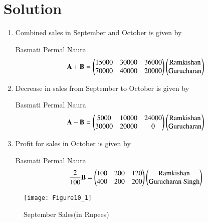 \documentclass[journal,12pt,twocolumn]{IEEEtran}
\begin{document}
\section{Solution}
%
\begin{enumerate}
    \item Combined sales in September and October is given by
    
    \hspace{1.4cm} Basmati \hspace{0.02cm} Permal \hspace{0.01cm} Naura
    \begin{align}
    \mathbf{A}+\mathbf{B}=\begin{pmatrix}15000 & 30000 & 36000 \\ 70000 & 40000 & 20000\end{pmatrix}\begin{pmatrix}\text{Ramkishan} \\ \text{Gurucharan}\end{pmatrix} 
    \end{align}
    
    \item Decrease in sales from September to October is given by

    \hspace{1.4cm} Basmati \hspace{0.02cm} Permal \hspace{0.01cm} Naura
    \begin{align}
    \mathbf{A}-\mathbf{B} = \begin{pmatrix}5000 & 10000 & 24000 \\ 30000 & 20000 & 0\end{pmatrix}\begin{pmatrix}\text{Ramkishan} \\ \text{Gurucharan}\end{pmatrix} 
    \end{align}
    
    \item Profit for sales in October is given by

    \hspace{0.6cm} Basmati \hspace{0.001cm} Permal \hspace{0.001cm} Naura
    \begin{align}
    \frac{2}{100}\mathbf{B} = \begin{pmatrix}100 & 200 & 120 \\ 400 & 200 & 200\end{pmatrix}\begin{pmatrix}\text{Ramkishan} \\ \text{Gurucharan Singh}\end{pmatrix} 
    \end{align} 

\end{enumerate}

\begin{figure}[!ht]
\centering
\texttt{[image: Figure10\_1]}
\caption{September Sales(in Rupees)}
\label{fig:SeptSales}	
\end{figure}
\end{document}
